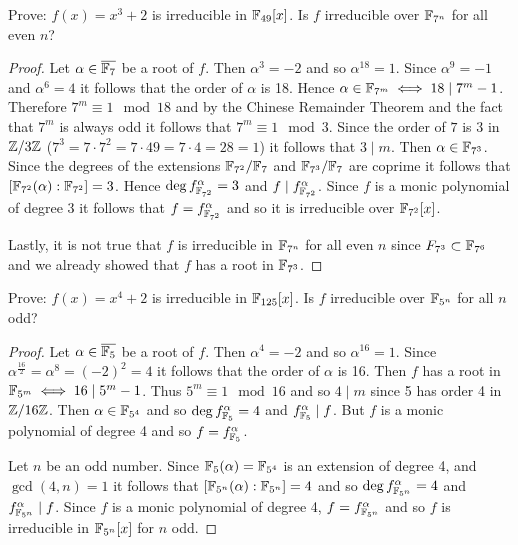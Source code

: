 \begin{ex}{22.16}
    Prove: $f(x)=x^3+2$ is irreducible in $\mathbb{F}_{49}[x]$. Is $f$ irreducible over $\mathbb{F}_{7^n}$ for all even $n$?
\end{ex}
\begin{proof}
    Let $\alpha\in\overline{\mathbb{F}_7}$ be a root of $f$. Then $\alpha^3=-2$ and so $\alpha^{18}=1$.
    Since $\alpha^9=-1$ and $\alpha^6=4$ it follows that the order of $\alpha$ is 18. 
    Hence $\alpha\in\mathbb{F}_{7^m}\iff 18\mid 7^m-1$. Therefore $7^m\equiv 1\mod 18$ and by the Chinese Remainder Theorem and the fact that $7^m$ is always odd it follows that $7^m\equiv 1\mod 3$.
    Since the order of $7$ is 3 in $\mathbb{Z}/3\mathbb{Z}$ ($7^3=7\cdot 7^2=7\cdot 49=7\cdot 4=28=1$) it follows that $3\mid m$.
    Then $\alpha\in\mathbb{F}_{7^3}$. 
    Since the degrees of the extensions $\mathbb{F}_{7^2}/\mathbb{F}_7$ and $\mathbb{F}_{7^3}/\mathbb{F}_7$ are coprime it follows that $[\mathbb{F}_{7^2}(\alpha):\mathbb{F}_{7^2}]=3$.
    Hence $\deg f_{\mathbb{F}_{7^2}}^\alpha = 3$ and $f\mid f_{\mathbb{F}_{7^2}}^\alpha$.
    Since $f$ is a monic polynomial of degree 3 it follows that $f= f_{\mathbb{F}_{7^2}}^\alpha$ and so it is irreducible over $\mathbb{F}_{7^2}[x]$.

    Lastly, it is not true that $f$ is irreducible in $\mathbb{F}_{7^n}$ for all even $n$ since $F_{7^3}\subset\mathbb{F}_{7^6}$ and we already showed that $f$ has a root in $\mathbb{F}_{7^3}$.
\end{proof}

\begin{ex}{22.17}
    Prove: $f(x)=x^4+2$ is irreducible in $\mathbb{F}_{125}[x]$. Is $f$ irreducible over $\mathbb{F}_{5^n}$ for all $n$ odd?
\end{ex}
\begin{proof}
    Let $\alpha\in\overline{\mathbb{F}_5}$ be a root of $f$. Then $\alpha^4=-2$ and so $\alpha^16=1$. 
    Since $\alpha^{\frac{16}{2}}=\alpha^8=(-2)^2=4$ it follows that the order of $\alpha$ is 16.
    Then $f$ has a root in $\mathbb{F}_{5^m}\iff 16\mid 5^m-1$. 
    Thus $5^m\equiv 1\mod 16$ and so $4\mid m$ since 5 has order 4 in $\mathbb{Z}/16\mathbb{Z}$.
    Then $\alpha\in\mathbb{F}_{5^4}$ and so $\deg f_{\mathbb{F}_5}^\alpha = 4$ and $f_{\mathbb{F}_5}^\alpha\mid f$.
    But $f$ is a monic polynomial of degree 4 and so $f=f_{\mathbb{F}_5}^\alpha$. 
    
    Let $n$ be an odd number. Since $\mathbb{F}_5(\alpha)=\mathbb{F}_{5^4}$ is an extension of degree 4, and $\gcd(4,n)=1$ it follows that $[\mathbb{F}_{5^n}(\alpha):\mathbb{F}_{5^n}]=4$
    and so $\deg f_{\mathbb{F}_{5^n}}^\alpha = 4$ and $f_{\mathbb{F}_{5^n}}^\alpha\mid f$. Since $f$ is a monic polynomial of degree 4, $f=f_{\mathbb{F}_{5^n}}^\alpha$ and so $f$ is irreducible in $\mathbb{F}_{5^n}[x]$ for $n$ odd.
\end{proof}

